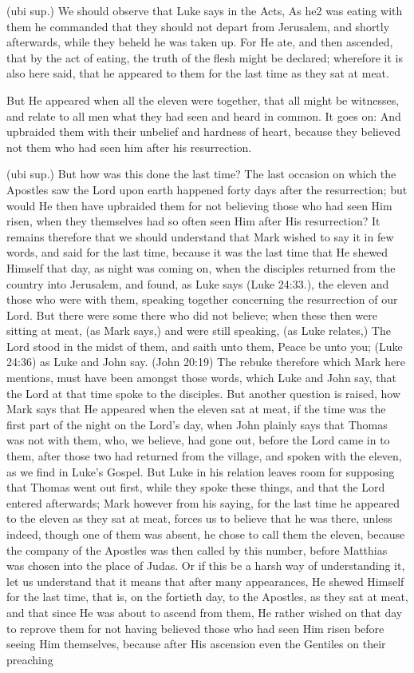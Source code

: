  (ubi sup.) We should observe that Luke says in the Acts, As he2 was eating with them he commanded that they should not depart from Jerusalem, and shortly afterwards, while they beheld he was taken up. For He ate, and then ascended, that by the act of eating, the truth of the flesh might be declared; wherefore it is also here said, that he appeared to them for the last time as they sat at meat.

 But He appeared when all the eleven were together, that all might be witnesses, and relate to all men what they had seen and heard in common. It goes on: And upbraided them with their unbelief and hardness of heart, because they believed not them who had seen him after his resurrection.

 (ubi sup.) But how was this done the last time? The last occasion on which the Apostles saw the Lord upon earth happened forty days after the resurrection; but would He then have upbraided them for not believing those who had seen Him risen, when they themselves had so often seen Him after His resurrection? It remains therefore that we should understand that Mark wished to say it in few words, and said for the last time, because it was the last time that He shewed Himself that day, as night was coming on, when the disciples returned from the country into Jerusalem, and found, as Luke says (Luke 24:33.), the eleven and those who were with them, speaking together concerning the resurrection of our Lord. But there were some there who did not believe; when these then were sitting at meat, (as Mark says,) and were still speaking, (as Luke relates,) The Lord stood in the midst of them, and saith unto them, Peace be unto you; (Luke 24:36) as Luke and John say. (John 20:19) The rebuke therefore which Mark here mentions, must have been amongst those words, which Luke and John say, that the Lord at that time spoke to the disciples. But another question is raised, how Mark says that He appeared when the eleven sat at meat, if the time was the first part of the night on the Lord’s day, when John plainly says that Thomas was not with them, who, we believe, had gone out, before the Lord came in to them, after those two had returned from the village, and spoken with the eleven, as we find in Luke’s Gospel. But Luke in his relation leaves room for supposing that Thomas went out first, while they spoke these things, and that the Lord entered afterwards; Mark however from his saying, for the last time he appeared to the eleven as they sat at meat, forces us to believe that he was there, unless indeed, though one of them was absent, he chose to call them the eleven, because the company of the Apostles was then called by this number, before Matthias was chosen into the place of Judas. Or if this be a harsh way of understanding it, let us understand that it means that after many appearances, He shewed Himself for the last time, that is, on the fortieth day, to the Apostles, as they sat at meat, and that since He was about to ascend from them, He rather wished on that day to reprove them for not having believed those who had seen Him risen before seeing Him themselves, because after His ascension even the Gentiles on their preaching 